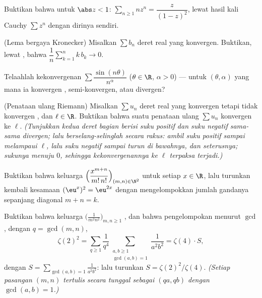 \begin{exercise}[$\star$]\label{exo:b2:series:2}
Buktikan bahwa untuk $\abs z < 1$: $\sum_{n\geq1} n z^{n} =
\dfrac{z}{(1-z)^2}$, lewat hasil kali Cauchy $\sum z^n$ dengan
dirinya sendiri.
\end{exercise}

\begin{exercise}[$\star\star$]\label{exo:b2:series:3}
(Lema bergaya Kronecker) Misalkan $\sum b_n$ deret real yang konvergen.
Buktikan, lewat , bahwa $\dfrac{1}{n}\sum_{k=1}^{n}
k\,b_k \to 0$.
\end{exercise}

\begin{exercise}[$\star\star$]\label{exo:b2:series:4}
Telaahlah kekonvergenan $\sum \dfrac{\sin(n\theta)}{n^\alpha}$
($\theta \in \R$, $\alpha > 0$) --- untuk $(\theta, \alpha)$ yang mana ia
konvergen , semi-konvergen, atau divergen?
\end{exercise}

\begin{exercise}[$\star\star\star$]\label{exo:b2:series:5}
(Penataan ulang Riemann) Misalkan $\sum u_n$ deret real yang konvergen
tetapi tidak konvergen , dan $\ell \in \R$. Buktikan bahwa
suatu penataan ulang $\sum u_n$ konvergen ke $\ell$.
\emph{(Tunjukkan kedua deret bagian berisi suku positif dan suku negatif
sama-sama divergen; lalu berselang-selinglah secara rakus: ambil suku
positif sampai melampaui $\ell$, lalu suku negatif sampai turun di
bawahnya, dan seterusnya; sukunya menuju $0$, sehingga
kekonvergenannya ke $\ell$ terpaksa terjadi.)}
\end{exercise}

\begin{exercise}[$\star\star$]\label{exo:b2:series:6}
Buktikan bahwa keluarga
$\Bigl(\dfrac{x^{m+n}}{m!\,n!}\Bigr)_{(m,n)\in\N^2}$ 
untuk setiap $x \in \R$, lalu turunkan kembali kesamaan $(\eu^x)^2 =
\eu^{2x}$ dengan mengelompokkan jumlah gandanya sepanjang diagonal $m +
n = k$.
\end{exercise}

\begin{exercise}[$\star\star$]\label{exo:b2:series:7}
Buktikan bahwa keluarga $\bigl(\frac{1}{m^2 n^2}\bigr)_{m,n \geq 1}$
, dan bahwa pengelompokan menurut $\gcd$, dengan $q = \gcd(m,n)$,
\[
\zeta(2)^2 = \sum_{q\geq1} \frac{1}{q^4}
\sum_{\substack{a,b \geq 1\\ \gcd(a,b)=1}} \frac{1}{a^2b^2}
= \zeta(4) \cdot S,
\]
dengan $S = \sum_{\gcd(a,b)=1} \frac{1}{a^2b^2}$: lalu turunkan $S =
\zeta(2)^2/\zeta(4)$. \emph{(Setiap pasangan $(m,n)$ tertulis secara
tunggal sebagai $(qa, qb)$ dengan $\gcd(a,b) = 1$.)}
\end{exercise}


